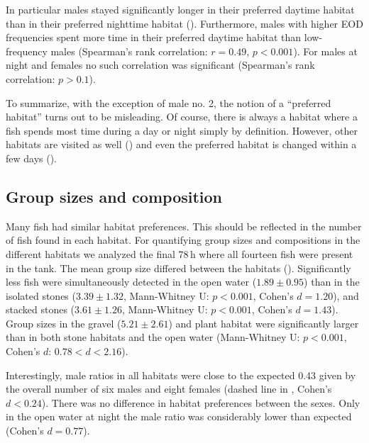 In particular males stayed significantly longer in their preferred daytime habitat than in their preferred nighttime habitat (). Furthermore, males with higher EOD frequencies spent more time in their preferred daytime habitat than low-frequency males (Spearman's rank correlation: $r=0.49$, $p<0.001$). For males at night and females no
such correlation was significant (Spearman's rank correlation: $p>0.1$).

To summarize, with the exception of male no. 2, the notion of a ``preferred habitat'' turns out to be misleading. Of course, there is always a habitat where a fish spends most time during a day or night simply by definition. However, other habitats are visited as well () and even the preferred habitat is changed within a few days ().

\subsection{Group sizes and composition}

Many fish had similar habitat preferences. This should be reflected in the number of fish found in each habitat. For quantifying group sizes and compositions in the different habitats we analyzed the final 78\,h where all fourteen fish were present in the tank. The mean group size differed between the habitats (). Significantly less fish were simultaneously detected in the open water ($1.89\pm 0.95$) than in the isolated stones ($3.39\pm 1.32$, Mann-Whitney U: $p<0.001$, Cohen's $d=1.20$), and stacked stones ($3.61\pm 1.26$, Mann-Whitney U: $p<0.001$, Cohen's $d=1.43$). Group sizes in the gravel ($5.21 \pm 2.61$) and plant habitat were significantly larger than in both stone habitats and the open water (Mann-Whitney U: $p<0.001$, Cohen’s $d$: $0.78<d<2.16$).

Interestingly, male ratios in all habitats were close to the expected 0.43 given by the overall number of six males and eight females (dashed line in , Cohen's $d<0.24$). There was no difference in habitat preferences between the sexes. Only in the open water at night the male ratio was considerably lower than expected (Cohen's $d=0.77$).

